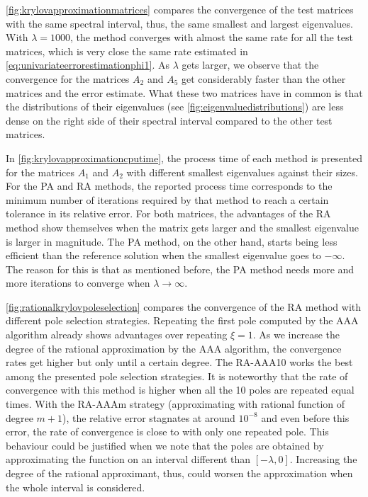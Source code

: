 \autoref{fig:krylovapproximationmatrices} compares the convergence of the
test matrices with the same spectral interval, thus, the same smallest and largest
eigenvalues.
With $\lambda = 1000$, the method converges with almost the same rate for all
the test matrices, which is very close the same rate estimated in
\eqref{eq:univariateerrorestimationphi1}.
As $\lambda$ gets larger, we observe that the convergence for the matrices
$A_2$ and $A_5$ get considerably faster than the other matrices and the error estimate.
What these two matrices have in common is that the distributions of their eigenvalues
(see \autoref{fig:eigenvaluedistributions}) are less dense on the right side of their
spectral interval compared to the other test matrices.

In \autoref{fig:krylovapproximationcputime}, the process time of each method is presented for
the matrices $A_1$ and $A_2$ with different smallest eigenvalues against their sizes. For
the PA and RA methods, the reported process time corresponds to the minimum number of
iterations required by that method to reach a certain tolerance in its relative error.
For both matrices, the advantages of the RA method show themselves when the matrix gets
larger and the smallest eigenvalue is larger in magnitude. The PA method, on the other hand,
starts being less efficient than the reference solution when the smallest eigenvalue goes
to $-\infty$. The reason for this is that as mentioned before, the PA method needs more
and more iterations to converge when $\lambda \to \infty$.

\autoref{fig:rationalkrylovpoleselection} compares the convergence of the RA method with different
pole selection strategies. Repeating the first pole computed by the AAA algorithm already shows
advantages over repeating $\xi = 1$. As we increase the degree of the rational approximation by
the AAA algorithm, the convergence rates get higher but only until a certain degree.
The RA-AAA10 works the best among the presented pole selection strategies. It is noteworthy that
the rate of convergence with this method is higher when all the 10 poles are repeated equal times.
With the RA-AAAm strategy (approximating with rational function of degree $m+1$), the relative
error stagnates at around $10^{-8}$ and even before this error, the rate of convergence is close
to with only one repeated pole. This behaviour could be justified when we note that the poles
are obtained by approximating the function on an interval different than $[-\lambda, 0]$.
Increasing the degree of the rational approximant, thus, could worsen the approximation when the
whole interval is considered.

